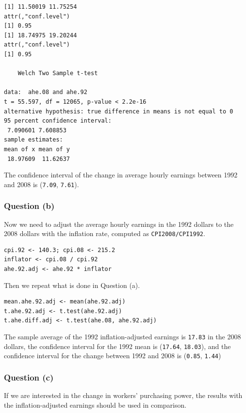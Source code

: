 \documentclass[a4paper,11pt]{article}
\begin{document}
\begin{itemize}
\begin{verbatim}
[1] 11.50019 11.75254
attr(,"conf.level")
[1] 0.95
[1] 18.74975 19.20244
attr(,"conf.level")
[1] 0.95

	Welch Two Sample t-test

data:  ahe.08 and ahe.92
t = 55.597, df = 12065, p-value < 2.2e-16
alternative hypothesis: true difference in means is not equal to 0
95 percent confidence interval:
 7.090601 7.608853
sample estimates:
mean of x mean of y
 18.97609  11.62637
\end{verbatim}

The confidence interval of the change in average hourly earnings
between 1992 and 2008 is (\texttt{7.09},
\texttt{7.61}).
\end{itemize}

\subsubsection*{Question (b)}
\label{sec:org9ce3934}

Now we need to adjust the average hourly earnings in the 1992 dollars
to the 2008 dollars with the inflation rate, computed as
\texttt{CPI2008/CPI1992}.

\begin{verbatim}
cpi.92 <- 140.3; cpi.08 <- 215.2
inflator <- cpi.08 / cpi.92
ahe.92.adj <- ahe.92 * inflator
\end{verbatim}

Then we repeat what is done in Question (a).

\begin{verbatim}
mean.ahe.92.adj <- mean(ahe.92.adj)
t.ahe.92.adj <- t.test(ahe.92.adj)
t.ahe.diff.adj <- t.test(ahe.08, ahe.92.adj)
\end{verbatim}

The sample average of the 1992 inflation-adjusted earnings is
\texttt{17.83} in the 2008 dollars, the confidence
interval for the 1992 mean is
(\texttt{17.64},
\texttt{18.03}), and the confidence
interval for the change between 1992 and 2008 is
(\texttt{0.85},
\texttt{1.44})

\subsubsection*{Question (c)}
\label{sec:org9efd6bb}

If we are interested in the change in workers' purchasing power, the
results with the inflation-adjusted earnings should be used in
comparison.
\end{document}
